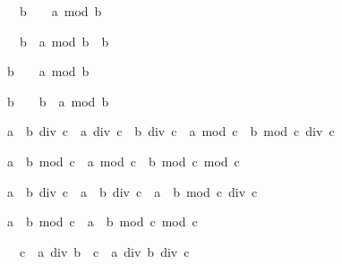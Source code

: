 \begin{isabellebody}
\begin{isamarkuptext}
\begin{isabelle}%
{}\ {\isacharless}\ b\ {\isasymLongrightarrow}\ {}\ {\isasymle}\ a\ mod\ b%
\end{isabelle}

\begin{isabelle}%
{}\ {\isacharless}\ b\ {\isasymLongrightarrow}\ a\ mod\ b\ {\isacharless}\ b%
\end{isabelle}

\begin{isabelle}%
b\ {\isacharless}\ {}\ {\isasymLongrightarrow}\ a\ mod\ b\ {\isasymle}\ {}%
\end{isabelle}

\begin{isabelle}%
b\ {\isacharless}\ {}\ {\isasymLongrightarrow}\ b\ {\isacharless}\ a\ mod\ b%
\end{isabelle}

\begin{isabelle}%
{\isacharparenleft}a\ {\isacharplus}\ b{\isacharparenright}\ div\ c\ {\isacharequal}\ a\ div\ c\ {\isacharplus}\ b\ div\ c\ {\isacharplus}\ {\isacharparenleft}a\ mod\ c\ {\isacharplus}\ b\ mod\ c{\isacharparenright}\ div\ c%
\end{isabelle}

\begin{isabelle}%
{\isacharparenleft}a\ {\isacharplus}\ b{\isacharparenright}\ mod\ c\ {\isacharequal}\ {\isacharparenleft}a\ mod\ c\ {\isacharplus}\ b\ mod\ c{\isacharparenright}\ mod\ c%
\end{isabelle}

\begin{isabelle}%
a\ {\isacharasterisk}\ b\ div\ c\ {\isacharequal}\ a\ {\isacharasterisk}\ {\isacharparenleft}b\ div\ c{\isacharparenright}\ {\isacharplus}\ a\ {\isacharasterisk}\ {\isacharparenleft}b\ mod\ c{\isacharparenright}\ div\ c%
\end{isabelle}

\begin{isabelle}%
a\ {\isacharasterisk}\ b\ mod\ c\ {\isacharequal}\ a\ {\isacharasterisk}\ {\isacharparenleft}b\ mod\ c{\isacharparenright}\ mod\ c%
\end{isabelle}

\begin{isabelle}%
{}\ {\isacharless}\ c\ {\isasymLongrightarrow}\ a\ div\ {\isacharparenleft}b\ {\isacharasterisk}\ c{\isacharparenright}\ {\isacharequal}\ a\ div\ b\ div\ c%
\end{isabelle}


\end{isamarkuptext}
\end{isabellebody}
